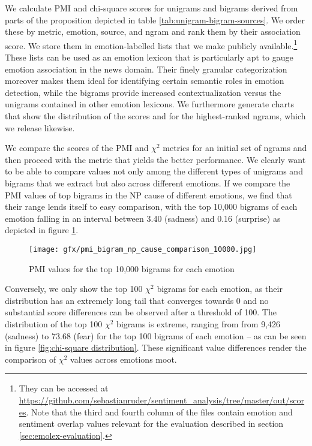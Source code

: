 We calculate PMI and chi-square scores for unigrams and bigrams derived from parts of the proposition depicted in table \ref{tab:unigram-bigram-sources}. We order these by metric, emotion, source, and ngram and rank them by their association score. We store them in emotion-labelled lists that we make publicly available.\footnote{They can be accessed at \url{https://github.com/sebastianruder/sentiment_analysis/tree/master/out/scores}. Note that the third and fourth column of the files contain emotion and sentiment overlap values relevant for the evaluation described in section \ref{sec:emolex-evaluation}.} These lists can be used as an emotion lexicon that is particularly apt to gauge emotion association in the news domain. Their finely granular categorization moreover makes them ideal for identifying certain semantic roles in emotion detection, while the bigrams provide increased contextualization versus the unigrams contained in other emotion lexicons. We furthermore generate charts that show the distribution of the scores and for the highest-ranked ngrams, which we release likewise.

We compare the scores of the PMI and $\chi^{2}$ metrics for an initial set of ngrams and then proceed with the metric that yields the better performance. We clearly want to be able to compare values not only among the different types of unigrams and bigrams that we extract but also across different emotions. If we compare the PMI values of top bigrams in the NP cause of different emotions, we find that their range lends itself to easy comparison, with the top 10,000 bigrams of each emotion falling in an interval between 3.40 (sadness) and 0.16 (surprise) as depicted in figure \ref{fig:pmi distribution}.

\begin{figure}[bth]
\texttt{[image: gfx/pmi\_bigram\_np\_cause\_comparison\_10000.jpg]}
\caption{PMI values for the top 10,000 bigrams for each emotion}\label{fig:pmi distribution}
\end{figure}

Conversely, we only show the top 100 $\chi^{2}$ bigrams for each emotion, as their distribution has an extremely long tail that converges towards 0 and no substantial score differences can be observed after a threshold of 100. The distribution of the top 100 $\chi^{2}$ bigrams is extreme, ranging from from 9,426 (sadness) to 73.68 (fear) for the top 100 bigrams of each emotion -- as can be seen in figure \ref{fig:chi-square distribution}. These significant value differences render the comparison of $\chi^{2}$ values across emotions moot.

